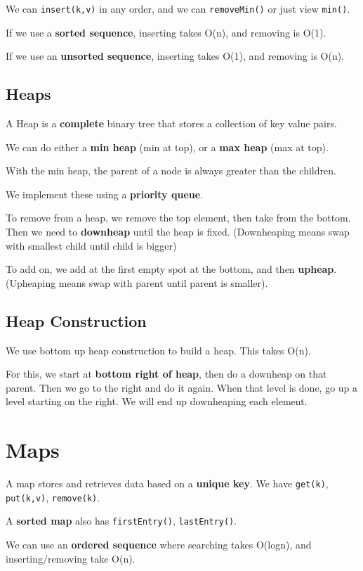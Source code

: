 \documentclass[12pt,letterpaper]{article} \usepackage{amsmath} \usepackage{graphicx} \usepackage[margin=1in]{geometry} \usepackage{longtable}  \usepackage{amssymb}
\begin{document}
	We can \verb|insert(k,v)| in any order, and we can \verb|removeMin()| or just view \verb|min()|.
	
	If we use a \textbf{sorted sequence}, inserting takes O(n), and removing is O(1). 
	
	If we use an\textbf{ unsorted sequence}, inserting takes O(1), and removing is O(n).
	
	\subsection{Heaps}
	A Heap is a \textbf{complete} binary tree that stores a collection of key value pairs. 
	
	We can do either a \textbf{min heap} (min at top), or a \textbf{max heap} (max at top).
	
	With the min heap, the parent of a node is always greater than the children. 
	
	We implement these using a \textbf{priority queue}. 
	
	To remove from a heap, we remove the top element, then take from the bottom. Then we need to \textbf{downheap }until the heap is fixed. (Downheaping means swap with smallest child until child is bigger)
	
	To add on, we add at the first empty spot at the bottom, and then \textbf{upheap}. (Upheaping means swap with parent until parent is smaller).
	
	\subsection{Heap Construction}
	We use bottom up heap construction to build a heap. This takes O(n).
	
	For this, we start at \textbf{bottom right of heap}, then do a downheap on that parent. Then we go to the right and do it again. When that level is done, go up a level starting on the right. We will end up downheaping each element.  

	
	\section{Maps}
	A map stores and retrieves data based on a \textbf{unique key}. We have \verb|get(k)|, \verb|put(k,v)|, \verb|remove(k)|.
	
	A \textbf{sorted map} also has \verb|firstEntry()|, \verb|lastEntry()|.
	
	We can use an \textbf{ordered sequence} where searching takes O(logn), and inserting/removing take O(n).
	
\end{document}
